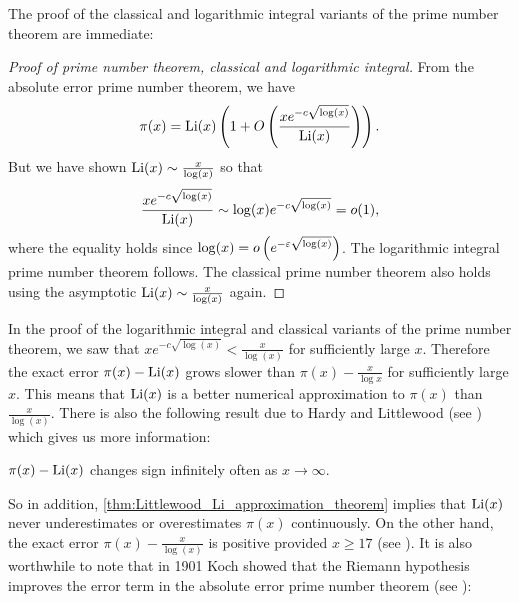     The proof of the classical and logarithmic integral variants of the prime number theorem are immediate:

    \begin{proof}[Proof of prime number theorem, classical and logarithmic integral]
      From the absolute error prime number theorem, we have
      \[
        \pi(x) = \operatorname{\mathrm{Li}}(x)\left(1+O\left(\frac{xe^{-c\sqrt{\log(x)}}}{\operatorname{\mathrm{Li}}(x)}\right)\right).
      \]
      But we have shown $\operatorname{\mathrm{Li}}(x) \sim \frac{x}{\log(x)}$ so that
      \[
        \frac{xe^{-c\sqrt{\log(x)}}}{\operatorname{\mathrm{Li}}(x)} \sim \log(x)e^{-c\sqrt{\log(x)}} = o(1),
      \]
      where the equality holds since $\log(x) = o\left(e^{-\varepsilon\sqrt{\log(x)}}\right)$. The logarithmic integral prime number theorem follows. The classical prime number theorem also holds using the asymptotic $\operatorname{\mathrm{Li}}(x) \sim \frac{x}{\log(x)}$ again.
    \end{proof}

    In the proof of the logarithmic integral and classical variants of the prime number theorem, we saw that $xe^{-c\sqrt{\log(x)}} < \frac{x}{\log(x)}$ for sufficiently large $x$. Therefore the exact error $\pi(x)-\operatorname{\mathrm{Li}}(x)$ grows slower than $\pi(x)-\frac{x}{\log{x}}$ for sufficiently large $x$. This means that $\operatorname{\mathrm{Li}}(x)$ is a better numerical approximation to $\pi(x)$ than $\frac{x}{\log(x)}$. There is also the following result due to Hardy and Littlewood (see \cite{hardy1916contributions}) which gives us more information:

    \begin{proposition}\label{thm:Littlewood_Li_approximation_theorem}
      $\pi(x)-\operatorname{\mathrm{Li}}(x)$ changes sign infinitely often as $x \to \infty$.
    \end{proposition}

    So in addition, \cref{thm:Littlewood_Li_approximation_theorem} implies that $\operatorname{\mathrm{Li}}(x)$ never underestimates or overestimates $\pi(x)$ continuously. On the other hand, the exact error $\pi(x)-\frac{x}{\log(x)}$ is positive provided $x \ge 17$ (see \cite{rosser1962approximate}). It is also worthwhile to note that in 1901 Koch showed that the Riemann hypothesis improves the error term in the absolute error prime number theorem (see \cite{von1901distribution}):

